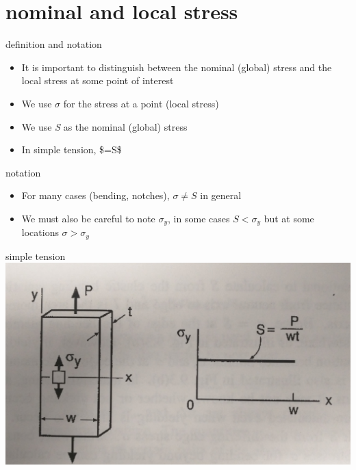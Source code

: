 \documentclass[
  letterpaper,
  ignorenonframetext,
  aspectratio=43,
  handout,
  12pt]{beamer}
\providecommand{\tightlist}{%
  \setlength{\itemsep}{0pt}\setlength{\parskip}{0pt}}
\providecommand{\tightlist}{%
\setlength{\itemsep}{0pt}\setlength{\parskip}{0pt}}
\let\Oldincludegraphics\includegraphics
\renewcommand{\includegraphics}[2][]{\Oldincludegraphics[width=\textwidth,height=0.7\textheight,keepaspectratio]{#2}}
\begin{document}
\hypertarget{nominal-and-local-stress}{%
\section{nominal and local stress}\label{nominal-and-local-stress}}

\begin{frame}{definition and notation}
\protect\hypertarget{definition-and-notation}{}
\begin{itemize}
\tightlist
\item
  It is important to distinguish between the nominal (global) stress and
  the local stress at some point of interest
\item
  We use \(\sigma\) for the stress at a point (local stress)
\item
  We use \emph{S} as the nominal (global) stress
\item
  In simple tension, \$\sigma=S\$
\end{itemize}
\end{frame}

\begin{frame}{notation}
\protect\hypertarget{notation}{}
\begin{itemize}
\tightlist
\item
  For many cases (bending, notches), \(\sigma \ne S\) in general
\item
  We must also be careful to note \(\sigma_y\), in some cases
  \(S < \sigma_y\) but at some locations \(\sigma > \sigma_y\)
\end{itemize}
\end{frame}

\begin{frame}{simple tension}
\protect\hypertarget{simple-tension}{}
\includegraphics{../images/p232-a.jpg}
\end{frame}
\end{document}
